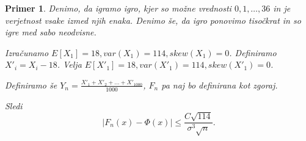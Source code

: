 \documentclass[12pt]{article}
\newtheorem{example}{Primer}
\begin{document}
\begin{example}
Denimo, da igramo igro, kjer so možne vrednosti $0,1,\dots, 36$ in je verjetnost vsake izmed njih enaka. Denimo še, da igro ponovimo tisočkrat in so igre med sabo neodvisne.

Izračunamo $E[X_1] = 18, var(X_1) = 114, skew(X_1) = 0$.
Definiramo $X'_i = X_i - 18$. Velja $E[X'_1] = 18, var(X'_1) = 114, skew(X'_1) = 0$.

Definiramo še $Y_n = \frac{X'_1 +X'_2 +\dots +X'_{1000}}{1000}$, $F_n$ pa naj bo definirana kot zgoraj.

Sledi $$|F_n(x) - \Phi(x)| \leq \frac{C \sqrt{114}}{\sigma^3\sqrt{n}}.$$



\end{example}
\end{document}
